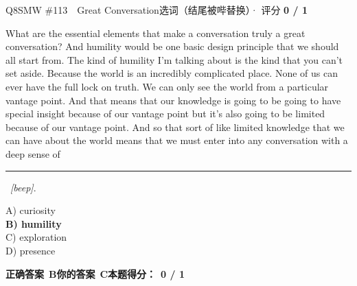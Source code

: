 \begin{qblock}{Q8\quad SMW \#113\ \ Great Conversation}{选词（结尾被哔替换）· 评分 \textcolor{cAccent}{\bfseries 0 / 1}}
\begin{promptbox}
What are the essential elements that make a conversation truly a great conversation? And humility would be one basic design principle that we should all start from. The kind of humility I'm talking about is the kind that you can't set aside. Because the world is an incredibly complicated place. None of us can ever have the full lock on truth. We can only see the world from a particular vantage point. And that means that our knowledge is going to be going to have special insight because of our vantage point but it's also going to be limited because of our vantage point. And so that sort of like limited knowledge that we can have about the world means that we must enter into any conversation with a deep sense of \rule[0.3ex]{1.2cm}{0.4pt}\ \textit{[beep]}.
\end{promptbox}
{\small
A) curiosity\\
{\color{cFix}\textbf{B) humility}}\\
C) exploration\\
D) presence}
\par\smallskip
\textbf{正确答案}\ \textcolor{cFix}{\bfseries B}\qquad\textbf{你的答案}\ {\color{cWrong}\bfseries C}\qquad\textbf{本题得分：}\ {\color{cAccent}\bfseries 0 / 1}
\end{qblock}

